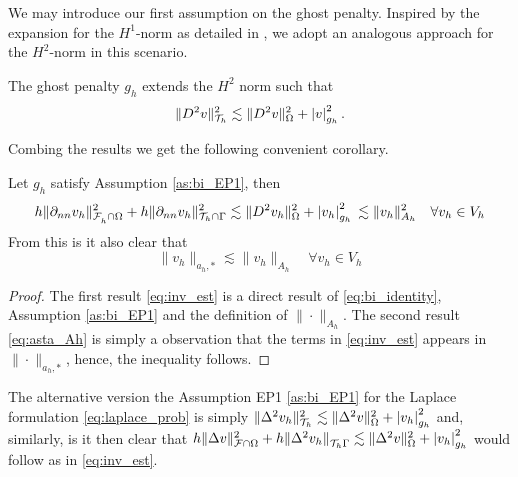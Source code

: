 We may introduce our first assumption on the ghost penalty.  Inspired by the expansion for the $H^{1}$-norm as detailed in \cite[Equation 2.23]{gurkan2019stabilized}, we adopt an analogous approach for the $H^{2}$-norm in this scenario.
\begin{assumption*}[EP1]
    \label{as:bi_EP1}
    The ghost penalty $g_{h}$ extends the $H^{2}$ norm such that
    \begin{equation}
    \| D^2 v \|_{ \mathcal{T} _{h} }^{ 2 } \lesssim  \| D^2 v \|_{ \Omega  }^{ 2 } + \left\lvert  v  \right\rvert _{g_{h}}^{2}.
    \end{equation}
\end{assumption*}


Combing the results we get the following convenient corollary.

\begin{corollary}
    \label{cor:bi_inverse_thm}
    Let  $g_{h}$ satisfy Assumption \ref{as:bi_EP1}, then
    \begin{equation}
        \label{eq:inv_est}
            h\| \partial _{nn}  v_{h} \|_{ \mathcal{F}_h^{} \cap \Omega    }^{2 } + h\| \partial _{nn} v_{h} \|_{ \mathcal{T} _{h} \cap \Gamma  }^{2  }   \lesssim  \| D^2 v_{h} \|_{ \Omega  }^{ 2 } + \left\lvert  v_{h}  \right\rvert _{g_{h}}^{2} \\
              \lesssim \| v_{h} \|_{ A_{h} }^{  2} \quad  \forall v_{h} \in V_{h}
    \end{equation}
    From this is it also clear that \begin{equation}
        \label{eq:asta_Ah}
    \| v_{h} \|_{ a_{h},* }^{  }  \lesssim \| v_{h} \|_{ A_{h} }^{  } \quad  \forall v_{h} \in V_{h}
    \end{equation}
\end{corollary}
\begin{proof}
    The first result \eqref{eq:inv_est} is a direct result of \eqref{eq:bi_identity}, Assumption \ref{as:bi_EP1} and the definition of $\| \cdot  \|_{ A_{h} }^{  } $.
    The second result \eqref{eq:asta_Ah} is simply a observation that the terms in \eqref{eq:inv_est} appears in $\| \cdot   \|_{a_{h},*  }^{  } $, hence, the inequality follows.
\end{proof}

\begin{remark}
    The alternative version the Assumption EP1 \ref{as:bi_EP1} for the Laplace formulation \eqref{eq:laplace_prob} is simply $\| \Delta ^2 v_{h} \|_{ \mathcal{T} _{h} }^{ 2 } \lesssim  \| \Delta ^2 v \|_{\Omega   }^{2  } + \left\lvert  v_{h}  \right\rvert _{g_{h}} ^{2}
    $ and, similarly, is it then clear that $ h \| \Delta v  \|_{\mathcal{F} \cap \Omega   }^{ 2 } +h \| \Delta^2 v_{h}  \|_{\mathcal{T} _{h} \Gamma   }^{  } \lesssim  \| \Delta ^2 v \|_{\Omega   }^{2  } + \left\lvert  v_{h}  \right\rvert _{g_{h}} ^{2} $ would follow  as in
    \eqref{eq:inv_est}.

\end{remark}

